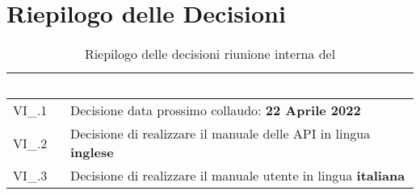 \section{Riepilogo delle Decisioni}


\begin{table}[!htbp]
    \renewcommand{\arraystretch}{1.5}
    \begin{tabular}{m{}<{\centering}  m{}<{\centering}}
        \rowcolor{darkblue} \textcolor{white}{\textbf{Codice}} & \textcolor{white}{\textbf{Decisione}}                        \\
        \hline
        VI\_{}\D{}.1                                           & Decisione data prossimo collaudo: \textbf{22 Aprile 2022} \\
        VI\_{}\D{}.2                                           & Decisione di realizzare il manuale delle API in lingua \textbf{inglese} \\
		VI\_{}\D{}.3                                           & Decisione di realizzare il manuale utente in lingua \textbf{italiana} \\
    \end{tabular}
    \caption{Riepilogo delle decisioni riunione interna del \D}
\end{table}